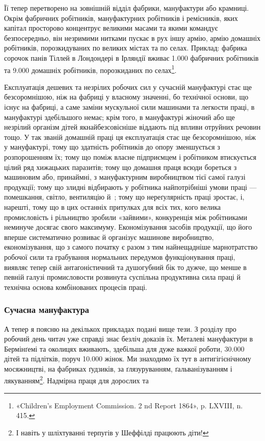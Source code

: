 \parcont{}  %
Її тепер перетворено на зовнішній відділ фабрики, мануфактури
або крамниці. Окрім фабричних робітників, мануфактурних робітників
і ремісників, яких капітал просторово концентрує великими
масами та якими командує безпосередньо, він незримими
нитками пускає в рух іншу армію, армію домашніх робітників,
порозкидуваних по великих містах та по селах. Приклад: фабрика
сорочок панів Тіллей в Лондондері в Ірляндії вживає \num{1.000} фабричних
робітників та \num{9.000} домашніх робітників, порозкиданих по
селах\footnote{
«Children’s Employment Commission. 2 nd Report 1864»,
p. LXVIII, n. 415.
}.

Експлуатація дешевих та незрілих робочих сил у сучасній
мануфактурі стає ще безсоромнішою, ніж на фабриці у власному
значенні, бо технічної основи, що існує на фабриці, а саме заміни
мускульної сили машинами та легкости праці, в мануфактурі
здебільшого немає; крім того, в мануфактурі жіночий або ще
незрілий організм дітей якнайбезсовісніше віддають під впливи
отруйних речовин тощо. У так званій домашній праці ця експлуатація
стає ще безсоромнішою, ніж у мануфактурі, тому що здатність
робітників до опору зменшується з розпорошенням їх;
тому що поміж власне підприємцем і робітником втискується цілий
ряд хижацьких паразитів; тому що домашня праця всюди бореться
з машиновим або, принаймні, з мануфактурним виробництвом тієї
самої галузі продукції; тому що злидні відбирають у робітника
найпотрібніші умови праці — помешкання, світло, вентиляцію
й~; тому що нереґулярність праці зростає, і, нарешті, тому
що в цих останніх притулках для всіх тих, кого велика промисловість
і рільництво зробили «зайвими», конкуренція між робітниками
неминуче досягає свого максимуму. Економізування
засобів продукції, що його вперше систематично розвиває й
організує машинове виробництво, економізування, що з самого
початку є разом з тим найнещадніше марнотратство робочої
сили та грабування нормальних передумов функціонування праці,
виявляє тепер свій антагоністичний та душогубний бік то дужче,
що менше в певній галузі промисловости розвинута суспільна
продуктивна сила праці й технічна основа комбінованих процесів
праці.

\subsubsection{Сучасна мануфактура}

А тепер я поясню на декількох прикладах подані вище тези.
З розділу про робочий день читач уже справді знає безліч доказів
їх. Металеві мануфактури в Бермінґемі та околицях вживають,
здебільша для дуже важкої роботи, \num{30.000} дітей та підлітків,
поруч \num{10.000} жінок. Ми знаходимо їх тут в антигігієнічному
мосяжництві, на фабриках ґудзиків, за ґлязуруванням, ґальванізуванням
і лякуванням\footnote{
І навіть у шліхтуванні терпугів у Шеффілді працюють діти!
}. Надмірна праця для дорослих та
\parbreak{}  %
